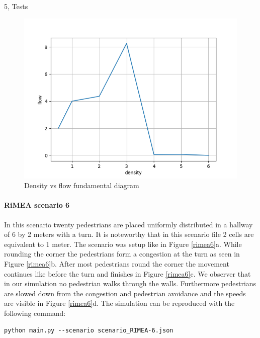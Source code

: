 \begin{task}{5, Tests}
\begin{figure}[h!]
\centering
  \includegraphics[scale=0.5]{report-template/image/myplot.png}
  \caption{Density vs flow fundamental diagram}
  \label{fig:density_flow_plot_2}
\end{figure}

\paragraph{RiMEA scenario 6}
In this scenario twenty pedestrians are placed uniformly distributed in a hallway of 6 by 2 meters with a turn. It is noteworthy that in this scenario file 2 cells are equivalent to 1 meter. The scenario was setup like in Figure \ref{rimea6}a. While rounding the corner the pedestrians form a congestion at the turn as seen in Figure \ref{rimea6}b. After most pedestrians round the corner the movement continues like before the turn and finishes in Figure \ref{rimea6}c. We observer that in our simulation no pedestrian walks through the walls. Furthermore pedestrians are slowed down from the congestion and pedestrian avoidance and the speeds are visible in Figure \ref{rimea6}d. The simulation can be reproduced with the following command:

\begin{verbatim}
python main.py --scenario scenario_RIMEA-6.json
\end{verbatim}


\end{task}
